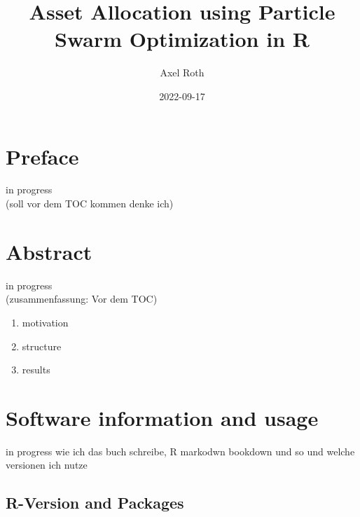 \documentclass[
  oneside]{book}
\title{Asset Allocation using Particle Swarm Optimization in R}
\author{Axel Roth}
\date{2022-09-17}
\begin{document}
\maketitle

{
\setcounter{tocdepth}{1}
\tableofcontents
}
\hypertarget{preface}{%
\chapter*{Preface}\label{preface}}

\renewcommand{\chaptermark}[1]{\markboth{\uppercase{#1}}{\uppercase{#1}}}

\textbar\textbar\textbar in progress\textbar\textbar\textbar{}\\
(soll vor dem TOC kommen denke ich)

\renewcommand{\chaptermark}[1]{\markboth{\uppercase{\thechapter. \ #1}}{}}

\hypertarget{abstract}{%
\chapter*{Abstract}\label{abstract}}

\textbar\textbar\textbar in progress\textbar\textbar\textbar{}\\
(zusammenfassung: Vor dem TOC)

\begin{enumerate}
\def\labelenumi{\arabic{enumi}.}
\item
  motivation
\item
  structure
\item
  results
\end{enumerate}

\hypertarget{software-information-and-usage}{%
\chapter{Software information and usage}\label{software-information-and-usage}}

\textbar\textbar\textbar in progress\textbar\textbar\textbar{}
wie ich das buch schreibe, R markodwn bookdown und so und welche versionen ich nutze

\hypertarget{r-version-and-packages}{%
\section{R-Version and Packages}\label{r-version-and-packages}}
\end{document}
